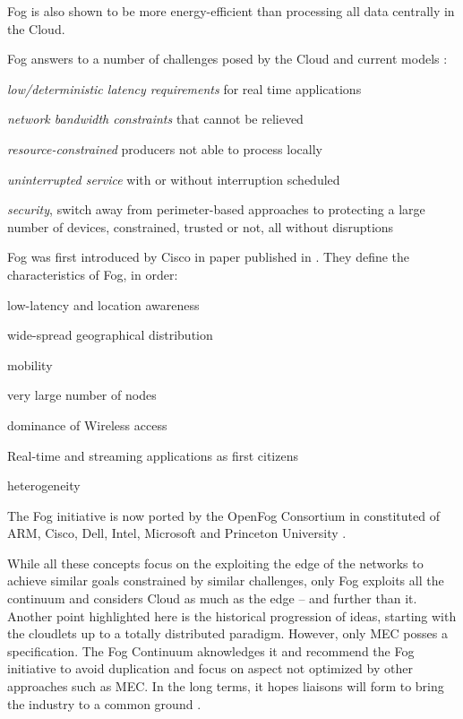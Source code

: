 \documentclass[11pt]{sdm}
\begin{document}
\begin{description}
	Fog is also shown to be more energy-efficient than processing all data centrally in the Cloud.
	
	Fog answers to a number of challenges posed by the Cloud and current models \cite{chiang_fog_2016}: 
	\begin{enumerate*}[(a)]
		\item \emph{low/deterministic latency requirements} for real time applications
		\item \emph{network bandwidth constraints} that cannot be relieved
		\item \emph{resource-constrained} producers not able to process locally
		\item \emph{uninterrupted service} with or without interruption scheduled
		\item \emph{security}, switch away from perimeter-based approaches to protecting a large number of devices, constrained, trusted or not, all without disruptions
	\end{enumerate*}
	
	Fog was first introduced by Cisco in  paper published in . They define the characteristics of Fog, in order:
	\begin{enumerate*}[(i)]
		\item low-latency and location awareness
		\item wide-spread geographical distribution
		\item mobility
		\item very large number of nodes
		\item dominance of Wireless access
		\item Real-time and streaming applications as first citizens
		\item heterogeneity
	\end{enumerate*}
	The Fog initiative is now ported by the OpenFog Consortium in  \cite{ieee_standards_association_ieee_2018} constituted of ARM, Cisco, Dell, Intel, Microsoft and Princeton University \cite{chiang_fog_2016}.
\end{description}


While all these concepts focus on the exploiting the edge of the networks to achieve similar goals constrained by similar challenges, only Fog exploits all the continuum and considers Cloud as much as the edge -- and further than it. Another point highlighted here is the historical progression of ideas, starting with the cloudlets up to a totally distributed paradigm. However, only \gls{MEC} posses a specification. The Fog Continuum aknowledges it and recommend the Fog initiative to avoid duplication and focus on aspect not optimized by other approaches such as \gls{MEC}. In the long terms, it hopes liaisons will form to bring the industry to a common ground \cite{ieee_standards_association_ieee_2018}.
\end{document}
